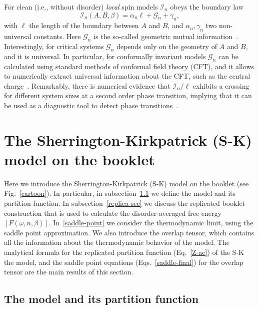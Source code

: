\documentclass[twocolumn,superscriptaddress,prb,10pt]{revtex4-1}
\begin{document}
For clean (i.e., without disorder) \emph{local} spin models ${\mathcal I}_n$ 
obeys the boundary law 
%
\begin{equation}
{\mathcal I}_n(A,B,\beta)=\alpha_n\ell+{\mathcal G}_n+\gamma_n,
\label{GMI}
\end{equation}
%
with $\ell$ the length of the boundary between $A$ and $B$, and 
$\alpha_n,\gamma_n$ two non-universal constants. Here ${\mathcal G}_n$ 
is the so-called geometric mutual information~\cite{stephan-2014}. 
Interestingly, for critical systems ${\mathcal G}_n$ depends only on the 
geometry of $A$ and $B$, and it is universal. In particular, for conformally 
invariant models ${\mathcal G}_n$ can be calculated using standard methods of 
conformal field theory (CFT), and it allows to numerically 
extract universal information about the CFT, such as the central 
charge~\cite{stephan-2014}.  Remarkably, there is numerical evidence that  
${\mathcal I}_n/\ell$ exhibits a crossing for different 
system sizes at a second order phase transition, implying that it 
can be used as a diagnostic tool to detect phase 
transitions~\cite{jaconis-2013}. 



\section{The Sherrington-Kirkpatrick (S-K) model on the booklet}
\label{the-model}

Here we introduce the Sherrington-Kirkpatrick (S-K) model on the booklet 
(see Fig.~\ref{cartoon}). In particular, in subsection~\ref{the-model-def}  
we define the model and its partition function. In subsection~\ref{replica-sec} 
we discuss the replicated booklet construction that is used to calculate the 
disorder-averaged free energy $[F(\omega,n,\beta)]$. 
In~\ref{saddle-point} we consider the thermodynamic limit, 
using the saddle point approximation. We also introduce the overlap tensor,  
which contains all the information about the thermodynamic behavior of the 
model. The analytical formula for the replicated partition function (Eq.~\eqref{Z-ac}) 
of the S-K the model, and the saddle point equations (Eqs.~\eqref{saddle-final}) 
for the overlap tensor are the main results of this section. 

\subsection{The model and its partition function}
\label{the-model-def}
\end{document}

